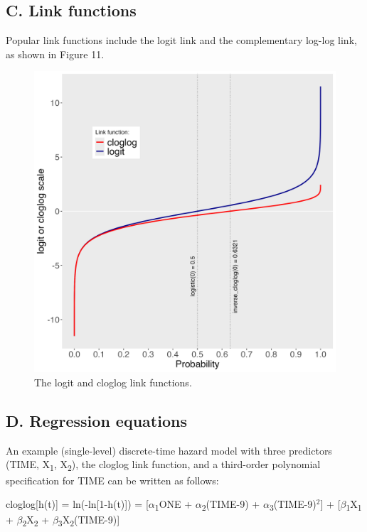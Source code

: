 \documentclass[
  man,floatsintext]{apa6}
\begin{document}
\subsection{C. Link functions}\label{c.-link-functions}

Popular link functions include the logit link and the complementary log-log link, as shown in Figure 11.



\begin{figure}[H]

{\centering \includegraphics[width=0.8\linewidth,height=0.67\textheight,]{../Tutorial_2_Bayesian/figures/linkfunctions} 

}

\caption{The logit and cloglog link functions.}\label{fig:plot-link-functions}
\end{figure}

\subsection{D. Regression equations}\label{d.-regression-equations}

An example (single-level) discrete-time hazard model with three predictors (TIME, X\textsubscript{1}, X\textsubscript{2}), the cloglog link function, and a third-order polynomial specification for TIME can be written as follows:

cloglog{[}h(t){]} = ln(-ln{[}1-h(t){]}) = {[}\(\alpha\)\textsubscript{1}ONE + \(\alpha\)\textsubscript{2}(TIME-9) + \(\alpha\)\textsubscript{3}(TIME-9)\(^2\){]} + {[}\(\beta\)\textsubscript{1}X\textsubscript{1} + \(\beta\)\textsubscript{2}X\textsubscript{2} + \(\beta\)\textsubscript{3}X\textsubscript{2}(TIME-9){]}
\end{document}
